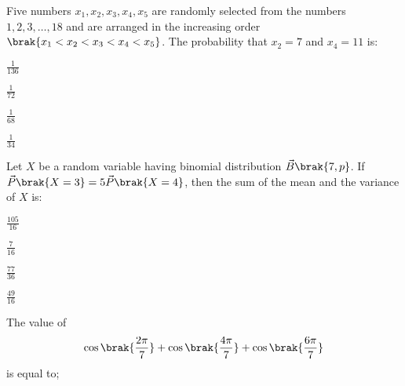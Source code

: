 \iffalse
\title{Assignment-2}
\author{EE24BTECH11049-Patnam Shariq Faraz Muhammed}
\section{mcq-single}
\fi

%
    
    \item 
    Five numbers $x_1, x_2, x_3, x_4, x_5$ are randomly selected from the numbers $1, 2, 3,\dots, 18$ and are arranged in the increasing order $\brak{x_1 < x_2 < x_3 < x_4 < x_5}$. The probability that $x_2 = 7$ and $x_4 = 11$ is:

    \hfill{}
    
    \begin{enumerate}
    \begin{multicols}{4}	
        \item $\frac{1}{136}$
        \item $\frac{1}{72}$
        \item $\frac{1}{68}$
        \item $\frac{1}{34}$
    \end{multicols}
    \end{enumerate}

    \item 
    Let $X$ be a random variable having binomial distribution $\vec{B}\brak{7, p}$. If $\vec{P}\brak{X = 3} = 5\vec{P}\brak{X = 4}$, then the sum of the mean and the variance of $X$ is: 

    \hfill{}
    
    \begin{enumerate}
    \begin{multicols}{4}
        \item $\frac{105}{16}$
        \item $\frac{7}{16}$
        \item $\frac{77}{36}$
        \item $\frac{49}{16}$
    \end{multicols}
    \end{enumerate}

    \item 
    The value of 
    \begin{align*}
        \cos{\brak{\frac{2\pi}{7}}} + \cos{\brak{\frac{4\pi}{7}}} + \cos{\brak{\frac{6\pi}{7}}} 
    \end{align*}
    is equal to;

